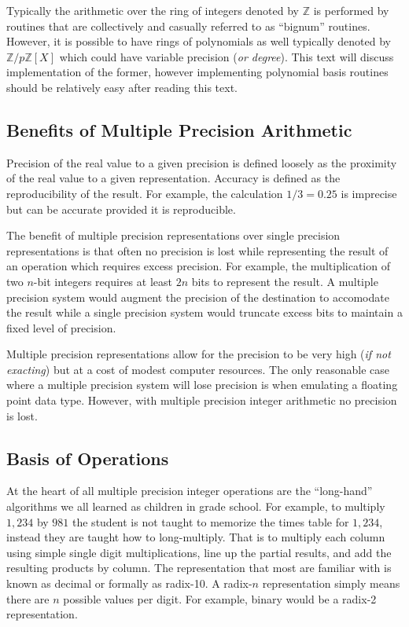 \documentclass[b5paper]{book}
\def\Z{{\mathbb Z}}
\begin{document}
Typically the arithmetic over the ring of integers denoted by $\Z$ is performed by routines that are collectively and 
casually referred to as ``bignum'' routines.  However, it is possible to have rings of polynomials as well typically 
denoted by $\Z/p\Z \left [ X \right ]$ which could have variable precision (\textit{or degree}).  This text will 
discuss implementation of the former, however implementing polynomial basis routines should be relatively easy after reading this text.

\subsection{Benefits of Multiple Precision Arithmetic}
 
Precision of the real value to a given precision is defined loosely as the proximity of the real value to a given representation.  
Accuracy is defined as the reproducibility of the result.  For example, the calculation $1/3 = 0.25$ is imprecise but can be accurate provided 
it is reproducible.

The benefit of multiple precision representations over single precision representations is that 
often no precision is lost while representing the result of an operation which requires excess precision.  For example, 
the multiplication of two $n$-bit integers requires at least $2n$ bits to represent the result.  A multiple precision 
system would augment the precision of the destination to accomodate the result while a single precision system would
truncate excess bits to maintain a fixed level of precision.

Multiple precision representations allow for the precision to be very high (\textit{if not exacting}) but at a cost of
modest computer resources.  The only reasonable case where a multiple precision system will lose precision is when
emulating a floating point data type.  However, with multiple precision integer arithmetic no precision is lost.

\subsection{Basis of Operations}
At the heart of all multiple precision integer operations are the ``long-hand'' algorithms we all learned as children 
in grade school.  For example, to multiply $1,234$ by $981$ the student is not taught to memorize the times table for 
$1,234$, instead they are taught how to long-multiply.  That is to multiply each column using simple single digit 
multiplications, line up the partial results, and add the resulting products by column.  The representation that most 
are familiar with is known as decimal or formally as radix-10. A radix-$n$ representation simply means there are 
$n$ possible values per digit.  For example, binary would be a radix-2 representation.
\end{document}
